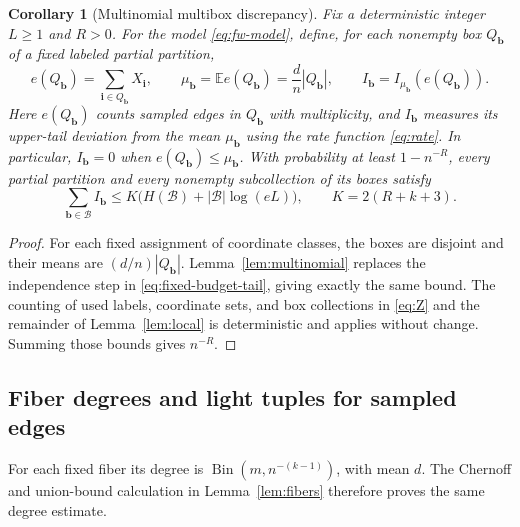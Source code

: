 \documentclass[10pt,a4paper]{amsart}
\numberwithin{equation}{section}
\newtheorem{corollary}[theorem]{Corollary}
\newcommand{\E}{\mathbb E}
\begin{document}
\begin{corollary}[Multinomial multibox discrepancy]\label{cor:multi-local}
Fix a deterministic integer $L\ge1$ and $R>0$.
For the model \eqref{eq:fw-model}, define, for each nonempty box
$Q_{\mathbf{b}}$ of a fixed labeled partial partition,
\[
 e(Q_{\mathbf{b}})=\sum_{\mathbf i\in Q_{\mathbf{b}}}X_{\mathbf i},
 \qquad \mu_{\mathbf{b}}=\E e(Q_{\mathbf{b}})=\frac dn|Q_{\mathbf{b}}|,
 \qquad I_{\mathbf{b}}=I_{\mu_{\mathbf{b}}}(e(Q_{\mathbf{b}})).
\]
Here $e(Q_{\mathbf{b}})$ counts sampled edges in $Q_{\mathbf{b}}$ with
multiplicity, and $I_{\mathbf{b}}$ measures its upper-tail deviation
from the mean $\mu_{\mathbf{b}}$ using the rate function
\eqref{eq:rate}. In particular, $I_{\mathbf{b}}=0$ when
$e(Q_{\mathbf{b}})\le\mu_{\mathbf{b}}$.
With probability at least $1-n^{-R}$, every partial
partition and every nonempty subcollection of its boxes satisfy
\[
 \sum_{\mathbf{b}\in\mathcal B}I_{\mathbf{b}}
 \le K\bigl(H(\mathcal B)+|\mathcal B|\log(eL)\bigr),
 \qquad K=2(R+k+3).
\]
\end{corollary}
\begin{proof}
For each fixed assignment of coordinate classes, the boxes are
disjoint and their means are $(d/n)|Q_{\mathbf{b}}|$.
Lemma~\ref{lem:multinomial} replaces the independence step in
\eqref{eq:fixed-budget-tail}, giving exactly the same bound.
The counting of used labels, coordinate sets, and box collections
in \eqref{eq:Z} and the remainder of Lemma~\ref{lem:local} is
deterministic and applies without change. Summing those bounds
gives $n^{-R}$.
\end{proof}

\subsection{Fiber degrees and light tuples for sampled edges}

For each fixed fiber its degree is
$\operatorname{Bin}(m,n^{-(k-1)})$, with mean $d$.
The Chernoff and union-bound calculation in
Lemma~\ref{lem:fibers} therefore proves the same degree estimate.
\end{document}
